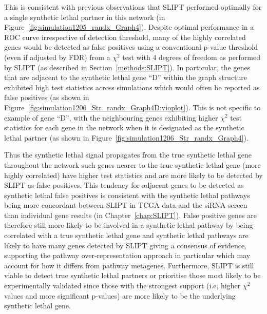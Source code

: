 This is consistent with previous observations that \gls{SLIPT} performed optimally for a single \gls{synthetic lethal} partner in this network (in Figure~\ref{fig:simulation1205_randx_Graph4}). Despite optimal performance in a \gls{ROC} curve irrespective of detection threshold, many of the highly correlated genes would be detected as false positives using a conventional p-value threshold (even if adjusted by \gls{FDR}) from a $\chi^2$ test with 4 degrees of freedom as performed by \gls{SLIPT} (as described in Section~\ref{methods:SLIPT}). In particular, the genes that are adjacent to the \gls{synthetic lethal} gene ``D'' within the \gls{graph} structure exhibited high test statistics across simulations which would often be reported as false positives (as shown in Figure~\ref{fig:simulation1206_Str_randx_Graph4D:vioplot}). This is not specific to example of gene ``D'', with the neighbouring genes exhibiting higher $\chi^2$ test statistics for each gene in the network when it is designated as the \gls{synthetic lethal} partner (as shown in Figure~\ref{fig:simulation1206_Str_randx_Graph4}).

Thus the \gls{synthetic lethal} signal propagates from the true \gls{synthetic lethal} gene throughout the network such genes nearer to the true \gls{synthetic lethal} gene (more highly correlated) have higher test statistics and are more likely to be detected by \gls{SLIPT} as false positives. This tendency for adjacent genes to be detected as \gls{synthetic lethal} false positives is consistent with the \gls{synthetic lethal} pathways being more concordant between \gls{SLIPT} in \gls{TCGA} data \citep{TCGA2012} and the \gls{siRNA} screen \citep{Telford2015} than individual gene results (in Chapter~\ref{chap:SLIPT}). False positive genes are therefore still more likely to be involved in a \gls{synthetic lethal} pathway by being correlated with a true \gls{synthetic lethal} gene and \gls{synthetic lethal} pathways are likely to have many genes detected by \gls{SLIPT} giving a consensus of evidence, supporting the pathway over-representation approach in particular which may account for how it differs from pathway \glspl{metagene}. Furthermore, \gls{SLIPT} is still viable to detect true \gls{synthetic lethal} partners or prioritise those most likely to be experimentally validated since those with the strongest support (i.e, higher $\chi^2$ values and more significant p-values) are more likely to be the underlying \gls{synthetic lethal} gene.

